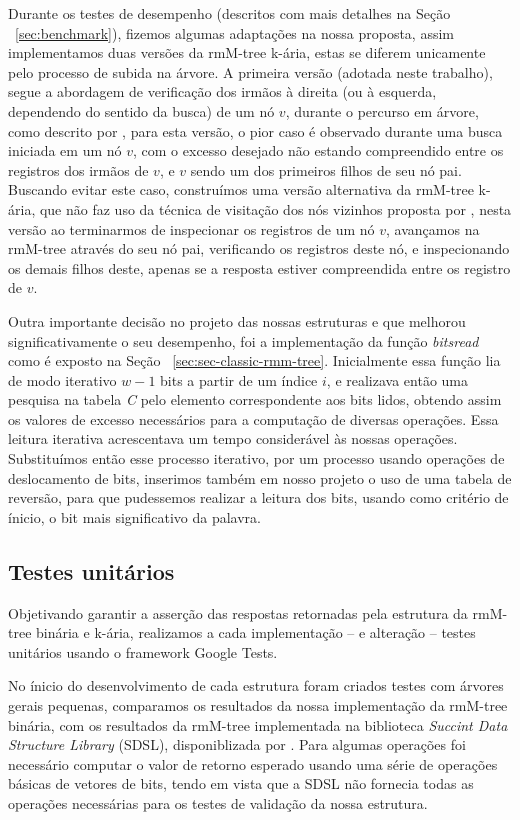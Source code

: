 Durante os testes de desempenho (descritos com mais detalhes na Seção ~\ref{sec:benchmark}), fizemos algumas adaptações na nossa proposta, assim implementamos duas versões da rmM-tree k-ária, estas se diferem unicamente pelo processo de subida na árvore. A primeira versão (adotada neste trabalho), segue a abordagem de verificação dos irmãos à direita  (ou à esquerda, dependendo do sentido da busca) de um nó $v$, durante o percurso em árvore, como descrito por \citet{book-compact-data-structures}, para esta versão, o pior caso é observado durante uma busca iniciada em um nó $v$, com o excesso desejado não estando compreendido entre os registros dos irmãos de $v$, e $v$ sendo um dos primeiros filhos de seu nó pai. Buscando evitar este caso, construímos uma versão alternativa da rmM-tree k-ária, que não faz uso da técnica de visitação dos nós vizinhos proposta por \citet{book-compact-data-structures}, nesta versão ao terminarmos de inspecionar os registros de um nó $v$, avançamos na rmM-tree através do seu nó pai, verificando os registros deste nó, e inspecionando os demais filhos deste, apenas se a resposta estiver compreendida entre os registro de $v$.   

Outra importante decisão no projeto das nossas estruturas e que melhorou significativamente o seu desempenho, foi a implementação da função \textit{bitsread} como é exposto na Seção ~\ref{sec:sec-classic-rmm-tree}. Inicialmente essa função lia de modo iterativo $w-1$ bits a partir de um índice $i$, e realizava então uma pesquisa na tabela \textit{C} pelo elemento correspondente aos bits lidos, obtendo assim os valores de excesso necessários para a computação de diversas operações. Essa leitura iterativa acrescentava um tempo considerável às nossas operações. Substituímos então esse processo iterativo, por um processo usando operações de deslocamento de bits, inserimos também em nosso projeto o uso de uma tabela de reversão, para que pudessemos realizar a leitura dos bits, usando como critério de ínicio, o bit mais significativo da palavra.

\subsection{Testes unitários}
Objetivando garantir a asserção das respostas retornadas pela estrutura da rmM-tree binária e k-ária, realizamos a cada implementação -- e alteração  -- testes unitários usando o framework Google Tests.

No ínicio do desenvolvimento de cada estrutura foram criados testes com árvores gerais pequenas, comparamos os resultados da nossa implementação da rmM-tree binária, com os resultados da rmM-tree implementada na biblioteca \textit{Succint Data Structure Library} (SDSL), disponiblizada por \citet{sdsl}. Para algumas operações foi necessário computar o valor de retorno esperado usando uma série de operações básicas de vetores de bits, tendo em vista  que a SDSL não fornecia todas as operações necessárias para os testes de validação da nossa estrutura.

